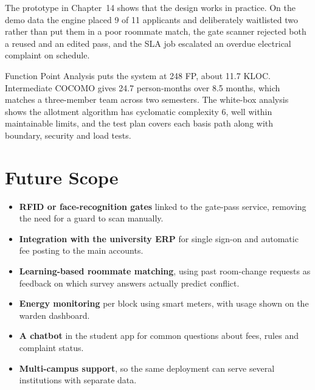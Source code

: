 \documentclass[11pt,a4paper]{report}
\begin{document}
The prototype in Chapter~14 shows that the design works in practice. On the demo data the engine placed 9 of 11 applicants and deliberately waitlisted two rather than put them in a poor roommate match, the gate scanner rejected both a reused and an edited pass, and the SLA job escalated an overdue electrical complaint on schedule.

Function Point Analysis puts the system at 248 FP, about 11.7 KLOC. Intermediate COCOMO gives 24.7 person-months over 8.5 months, which matches a three-member team across two semesters. The white-box analysis shows the allotment algorithm has cyclomatic complexity 6, well within maintainable limits, and the test plan covers each basis path along with boundary, security and load tests.

\section{Future Scope}
\begin{itemize}
  \item \textbf{RFID or face-recognition gates} linked to the gate-pass service, removing the need for a guard to scan manually.
  \item \textbf{Integration with the university ERP} for single sign-on and automatic fee posting to the main accounts.
  \item \textbf{Learning-based roommate matching}, using past room-change requests as feedback on which survey answers actually predict conflict.
  \item \textbf{Energy monitoring} per block using smart meters, with usage shown on the warden dashboard.
  \item \textbf{A chatbot} in the student app for common questions about fees, rules and complaint status.
  \item \textbf{Multi-campus support}, so the same deployment can serve several institutions with separate data.
\end{itemize}
\end{document}

